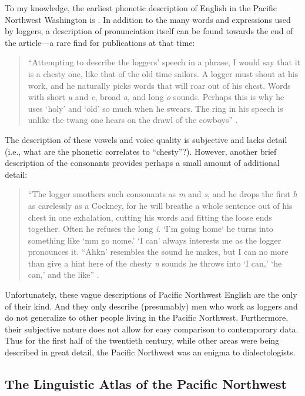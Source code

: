 To my knowledge, the earliest phonetic description of English in the Pacific Northwest Washington is \citet{stevens_1925}. In addition to the many words and expressions used by loggers, a description of pronunciation itself can be found towards the end of the article---a rare find for publications at that time:
\begin{quote}
    ``Attempting to describe the loggers' speech in a phrase, I would say that it is a chesty one, like that of the old time sailors. A logger must shout at his work, and he naturally picks words that will roar out of his chest. Words with short \textit{u} and \textit{e}, broad \textit{a}, and long \textit{o} sounds. Perhaps this is why he uses `holy' and `old' so much when he swears. The ring in his speech is unlike the twang one hears on the drawl of the cowboys'' \citep[139]{stevens_1925}.
\end{quote}
The description of these vowels and voice quality is subjective and lacks detail (i.e., what are the phonetic correlates to ``chesty''?). However, another brief description of the consonants provides perhaps a small amount of additional detail:
\begin{quote}
    ``The logger smothers such consonants as \textit{m} and \textit{s}, and he drops the first \textit{h} as carelessly as a Cockney, for he will breathe a whole sentence out of his chest in one exhalation, cutting his words and fitting the loose ends together. Often he refuses the long \textit{i}. `I'm going home` he turns into something like `mm go nome.' `I can' always interests me as the logger pronounces it. ``Ahkn' resembles the sound he makes, but I can no more than give a hint here of the chesty \textit{n} sounds he throws into `I can,' `he can,' and the like'' \citep[139]{stevens_1925}.
\end{quote}
Unfortunately, these vague descriptions of Pacific Northwest English are the only of their kind. And they only describe (presumably) men who work as loggers and do not generalize to other people living in the Pacific Northwest. Furthermore, their subjective nature does not allow for easy comparison to contemporary data. Thus for the first half of the twentieth century, while other areas were being described in great detail, the Pacific Northwest was an enigma to dialectologists.

\subsection{The Linguistic Atlas of the Pacific Northwest}

